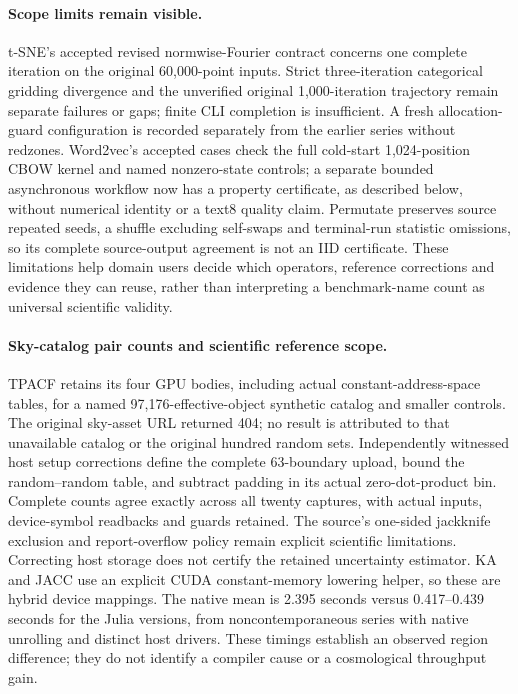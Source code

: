 \paragraph{Scope limits remain visible.}
t-SNE's accepted revised normwise-Fourier contract concerns one complete iteration on the original 60,000-point inputs. Strict three-iteration categorical gridding divergence and the unverified original 1,000-iteration trajectory remain separate failures or gaps; finite CLI completion is insufficient. A fresh allocation-guard configuration is recorded separately from the earlier series without redzones. Word2vec's accepted cases check the full cold-start 1,024-position CBOW kernel and named nonzero-state controls; a separate bounded asynchronous workflow now has a property certificate, as described below, without numerical identity or a text8 quality claim. Permutate preserves source repeated seeds, a shuffle excluding self-swaps and terminal-run statistic omissions, so its complete source-output agreement is not an IID certificate. These limitations help domain users decide which operators, reference corrections and evidence they can reuse, rather than interpreting a benchmark-name count as universal scientific validity.

\paragraph{Sky-catalog pair counts and scientific reference scope.}
TPACF retains its four GPU bodies, including actual constant-address-space tables, for a named 97,176-effective-object synthetic catalog and smaller controls. The original sky-asset URL returned 404; no result is attributed to that unavailable catalog or the original hundred random sets. Independently witnessed host setup corrections define the complete 63-boundary upload, bound the random--random table, and subtract padding in its actual zero-dot-product bin. Complete counts agree exactly across all twenty captures, with actual inputs, device-symbol readbacks and guards retained. The source's one-sided jackknife exclusion and report-overflow policy remain explicit scientific limitations. Correcting host storage does not certify the retained uncertainty estimator. KA and JACC use an explicit CUDA constant-memory lowering helper, so these are hybrid device mappings. The native mean is 2.395 seconds versus 0.417--0.439 seconds for the Julia versions, from noncontemporaneous series with native unrolling and distinct host drivers. These timings establish an observed region difference; they do not identify a compiler cause or a cosmological throughput gain.

